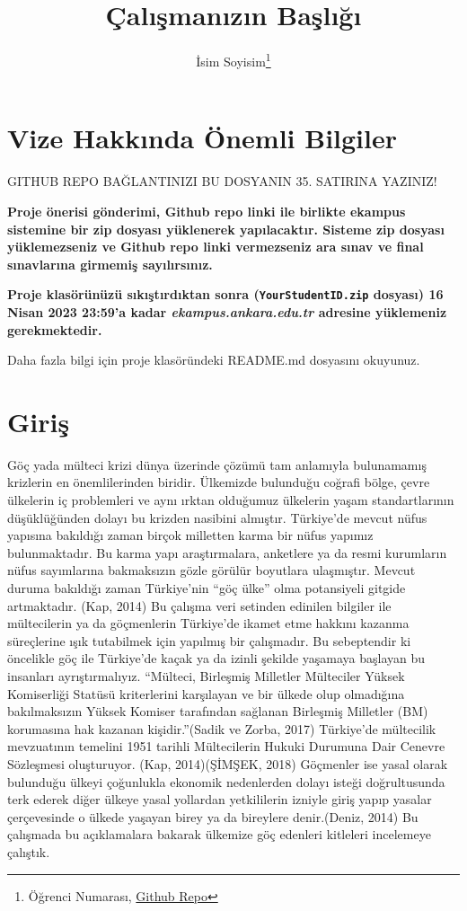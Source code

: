 \documentclass[
  12pt,
]{article}
\title{Çalışmanızın Başlığı}
\author{İsim Soyisim\footnote{Öğrenci Numarası, \href{https://github.com/KULLANICI_ADINIZ/REPO_ADINIZ}{Github Repo}}}
\date{}
\begin{document}
\maketitle

\hypertarget{vize-hakkux131nda-uxf6nemli-bilgiler}{%
\section{Vize Hakkında Önemli Bilgiler}\label{vize-hakkux131nda-uxf6nemli-bilgiler}}

\colorbox{BurntOrange}{GITHUB REPO BAĞLANTINIZI BU DOSYANIN 35. SATIRINA YAZINIZ!}

\textbf{Proje önerisi gönderimi, Github repo linki ile birlikte ekampus sistemine bir zip dosyası yüklenerek yapılacaktır. Sisteme zip dosyası yüklemezseniz ve Github repo linki vermezseniz ara sınav ve final sınavlarına girmemiş sayılırsınız.}

\textbf{Proje klasörünüzü sıkıştırdıktan sonra (\texttt{YourStudentID.zip} dosyası) 16 Nisan 2023 23:59'a kadar \emph{ekampus.ankara.edu.tr} adresine yüklemeniz gerekmektedir.}

\colorbox{WildStrawberry}{Daha fazla bilgi için proje klasöründeki README.md dosyasını okuyunuz.}

\hypertarget{giriux15f}{%
\section{Giriş}\label{giriux15f}}

Göç yada mülteci krizi dünya üzerinde çözümü tam anlamıyla bulunamamış krizlerin en
önemlilerinden biridir. Ülkemizde bulunduğu coğrafi bölge, çevre ülkelerin iç problemleri ve
aynı ırktan olduğumuz ülkelerin yaşam standartlarının düşüklüğünden dolayı bu krizden
nasibini almıştır. Türkiye'de mevcut nüfus yapısına bakıldığı zaman birçok milletten karma
bir nüfus yapımız bulunmaktadır. Bu karma yapı araştırmalara, anketlere ya da resmi
kurumların nüfus sayımlarına bakmaksızın gözle görülür boyutlara ulaşmıştır. Mevcut
duruma bakıldığı zaman Türkiye'nin ``göç ülke'' olma potansiyeli gitgide artmaktadır. (Kap,
2014) Bu çalışma veri setinden edinilen bilgiler ile mültecilerin ya da göçmenlerin Türkiye'de
ikamet etme hakkını kazanma süreçlerine ışık tutabilmek için yapılmış bir çalışmadır. Bu
sebeptendir ki öncelikle göç ile Türkiye'de kaçak ya da izinli şekilde yaşamaya başlayan
bu insanları ayrıştırmalıyız. ``Mülteci, Birleşmiş Milletler Mülteciler Yüksek Komiserliği
Statüsü kriterlerini karşılayan ve bir ülkede olup olmadığına bakılmaksızın Yüksek Komiser
tarafından sağlanan Birleşmiş Milletler (BM) korumasına hak kazanan kişidir.''(Sadik ve
Zorba, 2017) Türkiye'de mültecilik mevzuatının temelini 1951 tarihli Mültecilerin Hukuki
Durumuna Dair Cenevre Sözleşmesi oluşturuyor. (Kap, 2014)(ŞİMŞEK, 2018)
Göçmenler ise yasal olarak bulunduğu ülkeyi çoğunlukla ekonomik nedenlerden dolayı isteği
doğrultusunda terk ederek diğer ülkeye yasal yollardan yetkililerin izniyle giriş yapıp yasalar
çerçevesinde o ülkede yaşayan birey ya da bireylere denir.(Deniz, 2014)
Bu çalışmada bu açıklamalara bakarak ülkemize göç edenleri kitleleri incelemeye çalıştık.
\end{document}
